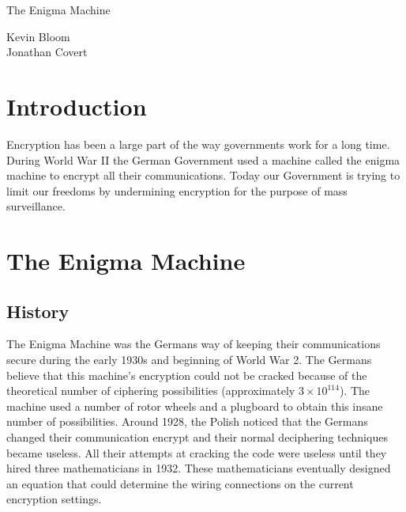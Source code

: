 \documentclass[12pt,a4paper,titlepage]{article}
\begin{document}
\pagestyle{headings}
\setcounter{page}{1}

\thispagestyle{empty}

\begin{flushleft}
\vspace*{1.5in}

{\huge The Enigma Machine}

\vspace{0.25in}

{\Large Kevin Bloom \\ Jonathan Covert}

\vspace{0.25in}

\vfill

\end{flushleft}

\newpage

\tableofcontents

\newpage

\section{Introduction}
Encryption has been a large part of the way governments work for a long time.  
During World War II the German Government used a machine called the enigma 
machine to encrypt all their communications. Today our Government is trying to 
limit our freedoms by undermining encryption for the purpose of mass 
surveillance.

\section{The Enigma Machine}

\subsection{History}
The Enigma Machine was the Germans way of keeping their communications secure 
during the early 1930s and beginning of World War 2. The Germans believe that 
this machine's encryption could not be cracked because of the theoretical number 
of ciphering possibilities (approximately $3 \times 10^{114}$). The machine used 
a number of rotor wheels and a plugboard to obtain this insane number of 
possibilities. Around 1928, the Polish noticed that the Germans changed their 
communication encrypt and their normal deciphering techniques became useless. 
All their attempts at cracking the code were useless until they hired three 
mathematicians in 1932. These mathematicians eventually designed an equation 
that could determine the wiring connections on the current encryption 
settings.
\end{document}
